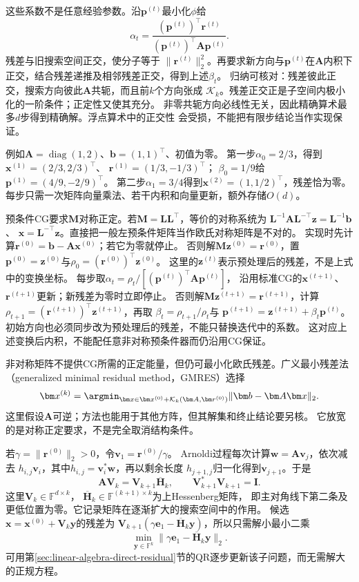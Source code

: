 这些系数不是任意经验参数。沿$\bm p^{(t)}$最小化$\phi$给
\[
 \alpha_t=\frac{(\bm p^{(t)})^\top\bm r^{(t)}}
                 {(\bm p^{(t)})^\top\bm A\bm p^{(t)}}.
\]
残差与旧搜索空间正交，使分子等于
$\lVert\bm r^{(t)}\rVert_2^2$。再要求新方向与$\bm p^{(t)}$在$\bm A$内积下
正交，结合残差递推及相邻残差正交，得到上述$\beta_t$。
归纳可核对：残差彼此正交，搜索方向彼此$\bm A$共轭，而且前$k$个方向张成
$\mathcal K_k$。残差正交正是子空间内极小化的一阶条件；正定性又使其充分。
非零共轭方向必线性无关，因此精确算术最多$d$步得到精确解。浮点算术中的正交性
会受损，不能把有限步结论当作实现保证。

例如$\bm A=\operatorname{diag}(1,2)$、$\bm b=(1,1)^\top$、初值为零。
第一步$\alpha_0=2/3$，得到
$\bm x^{(1)}=(2/3,2/3)^\top$、
$\bm r^{(1)}=(1/3,-1/3)^\top$；
$\beta_0=1/9$给$\bm p^{(1)}=(4/9,-2/9)^\top$。
第二步$\alpha_1=3/4$得到$\bm x^{(2)}=(1,1/2)^\top$，残差恰为零。
每步只需一次矩阵向量乘法、若干内积和向量更新，额外存储$O(d)$。

预条件CG要求$\bm M$对称正定。若$\bm M=\bm L\bm L^\top$，等价的对称系统为
$\bm L^{-1}\bm A\bm L^{-\top}\bm z=\bm L^{-1}\bm b$、
$\bm x=\bm L^{-\top}\bm z$。直接把一般左预条件矩阵当作欧氏对称矩阵是不对的。
实现时先计算$\bm r^{(0)}=\bm b-\bm A\bm x^{(0)}$；若它为零就停止。
否则解$\bm M\bm z^{(0)}=\bm r^{(0)}$，置
$\bm p^{(0)}=\bm z^{(0)}$与$\rho_0=(\bm r^{(0)})^\top\bm z^{(0)}$。
这里的$\bm z^{(t)}$表示预处理后的残差，不是上式中的变换坐标。
每步取$\alpha_t=\rho_t/[(\bm p^{(t)})^\top\bm A\bm p^{(t)}]$，
沿用标准CG的$\bm x^{(t+1)}$、$\bm r^{(t+1)}$更新；新残差为零时立即停止。
否则解$\bm M\bm z^{(t+1)}=\bm r^{(t+1)}$，计算
$\rho_{t+1}=(\bm r^{(t+1)})^\top\bm z^{(t+1)}$，再取
$\beta_t=\rho_{t+1}/\rho_t$与
$\bm p^{(t+1)}=\bm z^{(t+1)}+\beta_t\bm p^{(t)}$。
初始方向也必须同步改为预处理后的残差，不能只替换迭代中的系数。
这对应上述变换后内积，不能配任意非对称预条件器而仍沿用CG保证。


非对称矩阵不提供CG所需的正定能量，但仍可最小化欧氏残差。广义最小残差法
（generalized minimal residual method，GMRES）选择
\[
 \bm x^{(k)}
 =\argmin_{\bm x\in\bm x^{(0)}+\mathcal K_k(\bm A,\bm r^{(0)})}
      \lVert\bm b-\bm A\bm x\rVert_2.
\]
这里假设$\bm A$可逆；方法也能用于其他方阵，但其解集和终止结论要另核。
它放宽的是对称正定要求，不是完全取消结构条件。

若$\gamma=\lVert\bm r^{(0)}\rVert_2>0$，令$\bm v_1=\bm r^{(0)}/\gamma$。
Arnoldi过程每次计算$\bm w=\bm A\bm v_j$，依次减去
$h_{i,j}\bm v_i$，其中$h_{i,j}=\bm v_i^*\bm w$，再以剩余长度
$h_{j+1,j}$归一化得到$\bm v_{j+1}$。于是
\[
 \bm A\bm V_k=\bm V_{k+1}\overline{\bm H}_k,
 \qquad
 \bm V_{k+1}^*\bm V_{k+1}=\bm I.
\]
这里$\bm V_k\in\mathbb F^{d\times k}$，
$\overline{\bm H}_k\in\mathbb F^{(k+1)\times k}$为上Hessenberg矩阵，
即主对角线下第二条及更低位置为零。它记录矩阵在逐渐扩大的搜索空间中的作用。
候选$\bm x=\bm x^{(0)}+\bm V_k\bm y$的残差为
$\bm V_{k+1}(\gamma\bm e_1-\overline{\bm H}_k\bm y)$，所以只需解小最小二乘
\[
 \min_{\bm y\in\mathbb F^k}
 \lVert\gamma\bm e_1-\overline{\bm H}_k\bm y\rVert_2.
\]
可用第\ref{sec:linear-algebra-direct-residual}节的QR逐步更新该子问题，而无需解大的正规方程。

